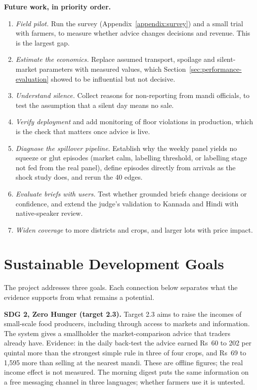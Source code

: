 \noindent\textbf{Future work, in priority order.}
\begin{enumerate}
    \item \emph{Field pilot.} Run the survey (Appendix~\ref{appendix:survey}) and a small trial with farmers, to measure whether advice changes decisions and revenue. This is the largest gap.
    \item \emph{Estimate the economics.} Replace assumed transport, spoilage and silent-market parameters with measured values, which Section~\ref{sec:performance-evaluation} showed to be influential but not decisive.
    \item \emph{Understand silence.} Collect reasons for non-reporting from mandi officials, to test the assumption that a silent day means no sale.
    \item \emph{Verify deployment} and add monitoring of floor violations in production, which is the check that matters once advice is live.
    \item \emph{Diagnose the spillover pipeline.} Establish why the weekly panel yields no squeeze or glut episodes (market calm, labelling threshold, or labelling stage not fed from the real panel), define episodes directly from arrivals as the shock study does, and rerun the 40 edges.
    \item \emph{Evaluate briefs with users.} Test whether grounded briefs change decisions or confidence, and extend the judge's validation to Kannada and Hindi with native-speaker review.
    \item \emph{Widen coverage} to more districts and crops, and larger lots with price impact.
\end{enumerate}

\section{Sustainable Development Goals}
\label{sec:sdgs-achieved}

The project addresses three goals. Each connection below separates what the evidence supports from what remains a potential.

\noindent\textbf{SDG 2, Zero Hunger (target 2.3).} Target 2.3 aims to raise the incomes of small-scale food producers, including through access to markets and information. The system gives a smallholder the market-comparison advice that traders already have. Evidence: in the daily back-test the advice earned Rs~60 to 202 per quintal more than the strongest simple rule in three of four crops, and Rs~69 to 1,595 more than selling at the nearest mandi. These are offline figures; the real income effect is not measured. The morning digest puts the same information on a free messaging channel in three languages; whether farmers use it is untested.


